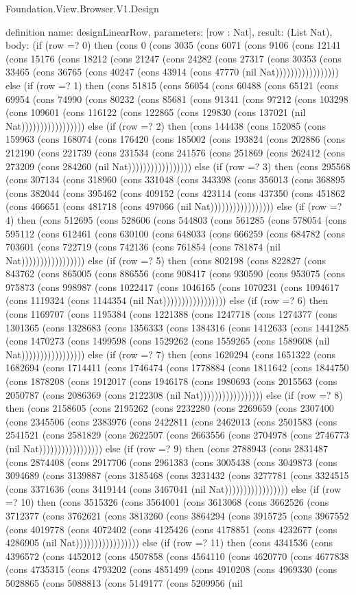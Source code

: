 \begin{lexlean}{Foundation.View.Browser.V1.Design}
\begin{semanticmodule}
definition{
  name: designLinearRow,
  parameters: [row : Nat],
  result: (List Nat),
  body: (if (row =? 0) then (cons 0 (cons 3035 (cons 6071 (cons 9106 (cons 12141 (cons 15176 (cons 18212 (cons 21247 (cons 24282 (cons 27317 (cons 30353 (cons 33465 (cons 36765 (cons 40247 (cons 43914 (cons 47770 (nil Nat))))))))))))))))) else (if (row =? 1) then (cons 51815 (cons 56054 (cons 60488 (cons 65121 (cons 69954 (cons 74990 (cons 80232 (cons 85681 (cons 91341 (cons 97212 (cons 103298 (cons 109601 (cons 116122 (cons 122865 (cons 129830 (cons 137021 (nil Nat))))))))))))))))) else (if (row =? 2) then (cons 144438 (cons 152085 (cons 159963 (cons 168074 (cons 176420 (cons 185002 (cons 193824 (cons 202886 (cons 212190 (cons 221739 (cons 231534 (cons 241576 (cons 251869 (cons 262412 (cons 273209 (cons 284260 (nil Nat))))))))))))))))) else (if (row =? 3) then (cons 295568 (cons 307134 (cons 318960 (cons 331048 (cons 343398 (cons 356013 (cons 368895 (cons 382044 (cons 395462 (cons 409152 (cons 423114 (cons 437350 (cons 451862 (cons 466651 (cons 481718 (cons 497066 (nil Nat))))))))))))))))) else (if (row =? 4) then (cons 512695 (cons 528606 (cons 544803 (cons 561285 (cons 578054 (cons 595112 (cons 612461 (cons 630100 (cons 648033 (cons 666259 (cons 684782 (cons 703601 (cons 722719 (cons 742136 (cons 761854 (cons 781874 (nil Nat))))))))))))))))) else (if (row =? 5) then (cons 802198 (cons 822827 (cons 843762 (cons 865005 (cons 886556 (cons 908417 (cons 930590 (cons 953075 (cons 975873 (cons 998987 (cons 1022417 (cons 1046165 (cons 1070231 (cons 1094617 (cons 1119324 (cons 1144354 (nil Nat))))))))))))))))) else (if (row =? 6) then (cons 1169707 (cons 1195384 (cons 1221388 (cons 1247718 (cons 1274377 (cons 1301365 (cons 1328683 (cons 1356333 (cons 1384316 (cons 1412633 (cons 1441285 (cons 1470273 (cons 1499598 (cons 1529262 (cons 1559265 (cons 1589608 (nil Nat))))))))))))))))) else (if (row =? 7) then (cons 1620294 (cons 1651322 (cons 1682694 (cons 1714411 (cons 1746474 (cons 1778884 (cons 1811642 (cons 1844750 (cons 1878208 (cons 1912017 (cons 1946178 (cons 1980693 (cons 2015563 (cons 2050787 (cons 2086369 (cons 2122308 (nil Nat))))))))))))))))) else (if (row =? 8) then (cons 2158605 (cons 2195262 (cons 2232280 (cons 2269659 (cons 2307400 (cons 2345506 (cons 2383976 (cons 2422811 (cons 2462013 (cons 2501583 (cons 2541521 (cons 2581829 (cons 2622507 (cons 2663556 (cons 2704978 (cons 2746773 (nil Nat))))))))))))))))) else (if (row =? 9) then (cons 2788943 (cons 2831487 (cons 2874408 (cons 2917706 (cons 2961383 (cons 3005438 (cons 3049873 (cons 3094689 (cons 3139887 (cons 3185468 (cons 3231432 (cons 3277781 (cons 3324515 (cons 3371636 (cons 3419144 (cons 3467041 (nil Nat))))))))))))))))) else (if (row =? 10) then (cons 3515326 (cons 3564001 (cons 3613068 (cons 3662526 (cons 3712377 (cons 3762621 (cons 3813260 (cons 3864294 (cons 3915725 (cons 3967552 (cons 4019778 (cons 4072402 (cons 4125426 (cons 4178851 (cons 4232677 (cons 4286905 (nil Nat))))))))))))))))) else (if (row =? 11) then (cons 4341536 (cons 4396572 (cons 4452012 (cons 4507858 (cons 4564110 (cons 4620770 (cons 4677838 (cons 4735315 (cons 4793202 (cons 4851499 (cons 4910208 (cons 4969330 (cons 5028865 (cons 5088813 (cons 5149177 (cons 5209956 (nil }
\end{semanticmodule}
\end{lexlean}
